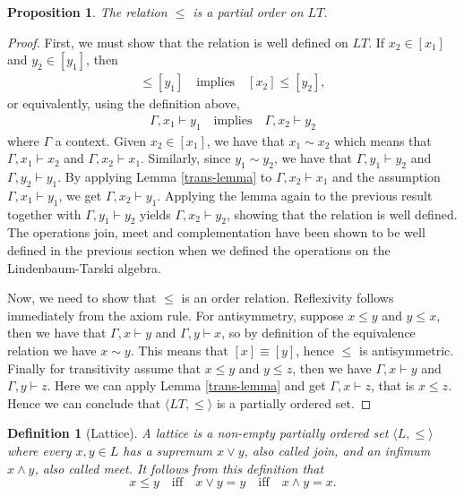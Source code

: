 \documentclass[titlepage]{article}
\newtheorem{definition}{Definition}[section]
\newtheorem{proposition}{Proposition}
\begin{document}
\begin{proposition}
    The relation $\leq$ is a partial order on $LT$.
\end{proposition}

\begin{proof}
    First, we must show that the relation is well defined on $LT$. If $x_2 \in [x_1]$ and $y_2\in [y_1]$, then 
    \begin{align*}
        [x_1] \leq [y_1] \quad \text{implies} \quad [x_2] \leq [y_2],
    \end{align*}
    or equivalently, using the definition above,
    \begin{align*}
        \Gamma, x_1 \vdash y_1 \quad \text{implies} \quad \Gamma, x_2 \vdash y_2
    \end{align*}
    where $\Gamma$ a context. Given $x_2 \in [x_1]$, we have that $x_1 \sim x_2$ which means that $\Gamma, x_1 \vdash x_2$ and $\Gamma, x_2 \vdash x_1$. Similarly, since $y_1 \sim y_2$, we have that $\Gamma, y_1 \vdash y_2$ and $\Gamma, y_2 \vdash y_1$. By applying Lemma \ref{trans-lemma} to $\Gamma, x_2 \vdash x_1$ and the assumption $\Gamma, x_1 \vdash y_1$, we get $\Gamma, x_2 \vdash y_1$. Applying the lemma again to the previous result together with $\Gamma, y_1 \vdash y_2$ yields $\Gamma, x_2 \vdash y_2$, showing that the relation is well defined. The operations join, meet and complementation have been shown to be well defined in the previous section when we defined the operations on the Lindenbaum-Tarski algebra.

    Now, we need to show that $\leq$ is an order relation. Reflexivity follows immediately from the axiom rule. For antisymmetry, suppose $x \leq y$ and $y \leq x$, then we have that $\Gamma, x \vdash y$ and $\Gamma, y \vdash x$, so by definition of the equivalence relation we have $x \sim y$. This means that $[x] \equiv [y]$, hence $\leq$ is antisymmetric. Finally for transitivity assume that $x \leq y$ and $y \leq z$, then we have $\Gamma, x \vdash y$ and $\Gamma, y \vdash z$. Here we can apply Lemma \ref{trans-lemma} and get $\Gamma, x \vdash z$, that is $x \leq z$. Hence we can conclude that $\langle LT, \leq \rangle$ is a partially ordered set.
\end{proof}


\begin{definition}[Lattice]\label{lattice}
    A lattice is a non-empty partially ordered set $\langle L, \leq \rangle$ where every $x,y \in L$ has a supremum $x\vee y$, also called join, and an infimum $x \wedge y$, also called meet. It follows from this definition that
    $$x \leq y \quad \text{iff} \quad x \vee y = y \quad \text{iff} \quad x \wedge y = x.$$
\end{definition}
\end{document}
